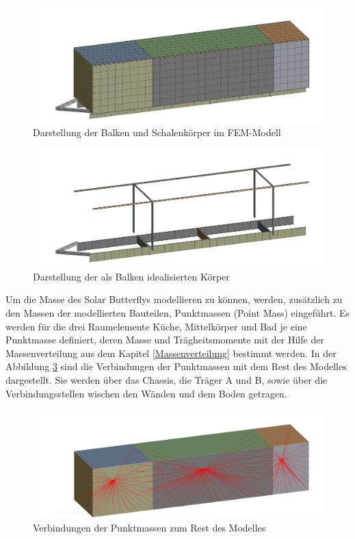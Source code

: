 \begin{figure}[H]
  \centering
  \centering
  \includegraphics[width=.7\linewidth]{04_figures/FEM Mesh1.png}
  \caption{Darstellung der Balken und Schalenkörper im FEM-Modell}
  \label{FEM Mesh1}
\end{figure}
\begin{figure}[H]
  \centering
  \includegraphics[width=.7\linewidth]{04_figures/FEM Mesh3.png}
  \caption{Darstellung der als Balken idealisierten Körper}
  \label{FEM Mesh3}
\end{figure}

Um die Masse des Solar Butterflys modellieren zu können, werden, zusätzlich zu den Massen der modellierten Bauteilen, Punktmassen (Point Mass) eingeführt. Es werden für die drei Raumelemente Küche, Mittelkörper und Bad je eine Punktmasse definiert, deren Masse und Trägheitsmomente mit der Hilfe der Massenverteilung aus dem Kapitel \ref{Massenverteilung} bestimmt werden. In der Abbildung \ref{img:FEM Punktmasse} sind die Verbindungen der Punktmassen mit dem Rest des Modelles dargestellt. Sie werden über das Chassis, die Träger A und B, sowie über die Verbindungsstellen wischen den Wänden und dem Boden getragen.\\
\begin{figure}[H]
  \centering
  \includegraphics[width=0.7\linewidth]{04_Figures/FEM Punktmasse.png}
  \caption{Verbindungen der Punktmassen zum Rest des Modelles}
  \label{img:FEM Punktmasse}
\end{figure}

